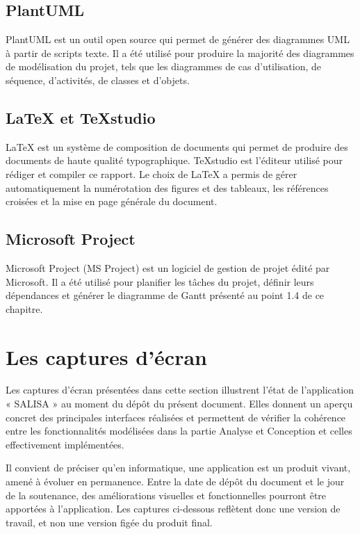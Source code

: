 \subsection*{\textcolor{vertCongo}{PlantUML}}

PlantUML est un outil open source qui permet de générer des diagrammes UML à partir de scripts texte. Il a été utilisé pour produire la majorité des diagrammes de modélisation du projet, tels que les diagrammes de cas d'utilisation, de séquence, d'activités, de classes et d'objets.

\subsection*{\textcolor{vertCongo}{LaTeX et TeXstudio}}

LaTeX est un système de composition de documents qui permet de produire des documents de haute qualité typographique. TeXstudio est l'éditeur utilisé pour rédiger et compiler ce rapport. Le choix de LaTeX a permis de gérer automatiquement la numérotation des figures et des tableaux, les références croisées et la mise en page générale du document.

\subsection*{\textcolor{vertCongo}{Microsoft Project}}

Microsoft Project (MS Project) est un logiciel de gestion de projet édité par Microsoft. Il a été utilisé pour planifier les tâches du projet, définir leurs dépendances et générer le diagramme de Gantt présenté au point 1.4 de ce chapitre.

\section{Les captures d'écran}

Les captures d'écran présentées dans cette section illustrent l'état de l'application « SALISA » au moment du dépôt du présent document. Elles donnent un aperçu concret des principales interfaces réalisées et permettent de vérifier la cohérence entre les fonctionnalités modélisées dans la partie Analyse et Conception et celles effectivement implémentées.

Il convient de préciser qu'en informatique, une application est un produit vivant, amené à évoluer en permanence. Entre la date de dépôt du document et le jour de la soutenance, des améliorations visuelles et fonctionnelles pourront être apportées à l'application. Les captures ci-dessous reflètent donc une version de travail, et non une version figée du produit final.

